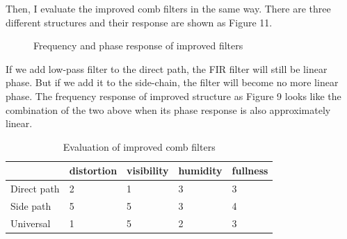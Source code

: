 \documentclass[a4paper]{tufte-handout} %
\begin{document}
Then, I evaluate the improved comb filters in the same way. There are three different structures and their response are shown as Figure 11.
\begin{figure}[h!]
    \centering
    \caption{Frequency and phase response of improved filters}
\end{figure}
If we add low-pass filter to the direct path, the FIR filter will still be linear phase. But if we add it to the side-chain, the filter will become no more linear phase. The frequency response of improved structure as Figure 9 looks like the combination of the two above when its phase response is also approximately linear. 
\begin{table}[ht]
	\centering
	\selectfont
	\begin{tabular}{l l l l l}
		\toprule
		 & distortion & visibility & humidity & fullness \\
		\midrule
		Direct path & 2 & 1 & 3 & 3 \\
		Side path & 5 & 5 & 3 & 4 \\
		Universal & 1 & 5 & 2 & 3 \\
		\bottomrule
	\end{tabular}
	\caption{Evaluation of improved comb filters}
	\label{tab:normaltab}
\end{table}
\end{document}
